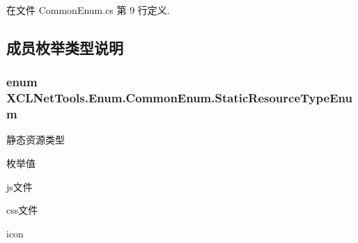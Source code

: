 在文件 Common\-Enum.\-cs 第 9 行定义.



\subsection{成员枚举类型说明}
\hypertarget{class_x_c_l_net_tools_1_1_enum_1_1_common_enum_abe6c6928080288df4a77ec8a59c537d1}{
\subsubsection[{Static\-Resource\-Type\-Enum}]{\setlength{\rightskip}{0pt plus 5cm}enum {\bf X\-C\-L\-Net\-Tools.\-Enum.\-Common\-Enum.\-Static\-Resource\-Type\-Enum}}}\label{class_x_c_l_net_tools_1_1_enum_1_1_common_enum_abe6c6928080288df4a77ec8a59c537d1}


静态资源类型 

\begin{Desc}
\item[枚举值]\par
\begin{description}
\item[{\em 
\hypertarget{class_x_c_l_net_tools_1_1_enum_1_1_common_enum_abe6c6928080288df4a77ec8a59c537d1a5bc06f5800d415cc95e1349edbaca425}{J\-S}\label{class_x_c_l_net_tools_1_1_enum_1_1_common_enum_abe6c6928080288df4a77ec8a59c537d1a5bc06f5800d415cc95e1349edbaca425}
}]js文件 \item[{\em 
\hypertarget{class_x_c_l_net_tools_1_1_enum_1_1_common_enum_abe6c6928080288df4a77ec8a59c537d1a2c56c360580420d293172f42d85dfbed}{C\-S\-S}\label{class_x_c_l_net_tools_1_1_enum_1_1_common_enum_abe6c6928080288df4a77ec8a59c537d1a2c56c360580420d293172f42d85dfbed}
}]css文件 \item[{\em 
\hypertarget{class_x_c_l_net_tools_1_1_enum_1_1_common_enum_abe6c6928080288df4a77ec8a59c537d1add912956b69fb3e570820021206968a3}{I\-C\-O\-N}\label{class_x_c_l_net_tools_1_1_enum_1_1_common_enum_abe6c6928080288df4a77ec8a59c537d1add912956b69fb3e570820021206968a3}
}]icon \end{description}
\end{Desc}


